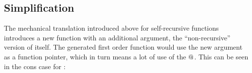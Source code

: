 \begin{comment}
\subsection{Mutually Recursive Functions}

You can also mechanically transform mutually recursive functions to be
defined in terms of \hs{fix}. The functions \hs{even} and \hs{odd}
defined below, which determines if a \hs{Nat} is even, and odd,
respectively, are straightforwardly written by mutual recursion:

\begin{code}
even :: Nat -> Bool           odd :: Nat -> Bool
even Z     = True             odd Z     = False
even (S x) = odd x            odd (S x) = even x
\end{code}

To write these functions in terms of fix, as an additional argument,
the take a tuple of ``non-recursive'' copies of themselves.

\begin{code}
evenToFix :: (Nat -> Bool,Nat -> Bool) -> Nat -> Bool
evenToFix (evenUnFix,oddUnFix) Z     = True
evenToFix (evenUnFix,oddUnFix) (S x) = oddUnFix x

oddToFix :: (Nat -> Bool,Nat -> Bool) -> Nat -> Bool
oddToFix (evenUnFix,oddUnFix) Z     = True
oddToFix (evenUnFix,oddUnFix) (S x) = evenUnFix x
\end{code}

Here the prefix \hs{ToFix} means that it is a function subject to be
\hs{fix}-ed, and \hs{UnFix} means that it is the ``non-recursive''
function. The functions above can now be \hs{fix}-ed by giving the
tuple as an argument to both of them:

\begin{code}
even',odd' :: Nat -> Bool
(even',odd') = fix (\t -> (evenToFix t,oddToFix t))
\end{code}

This encoding makes \hs{even'} denotationally equal to \hs{even} and
the same relation hols for \hs{odd'} and \hs{odd}.
\end{comment}

\subsection{Simplification}

The mechanical translation introduced above for self-recursive
functions introduces a new function with an additional argument, the
``non-recursive'' version of itself. The generated first order
function would use the new argument as a function pointer, which in
turn means a lot of use of the $@$. This can be seen in the cons
case for :

